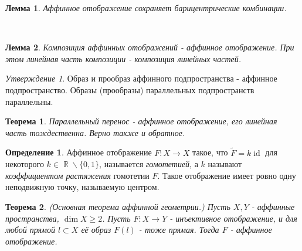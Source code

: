 \documentclass[a4paper,100pt]{article}
\theoremstyle{indented}
\newtheorem{theorem}{Теорема}
\newtheorem{lemma}{Лемма}
\theoremstyle{definition}
\newtheorem{defn}{Определение}
\theoremstyle{remark}
\newtheorem{stat}{Утверждение}
\DeclareMathOperator{\ra}{\rightarrow}
\DeclareMathOperator{\id}{id}
\DeclareMathOperator{\RR}{\mathbb{R}}
\begin{document}
\begin{lemma}
    Аффинное отображение сохраняет барицентрические комбинации.
\end{lemma} \ 

\begin{lemma}
    Композиция аффинных отображений - аффинное отображение. При этом линейная часть композиции - композиция линейных частей.
\end{lemma}

\begin{stat}
    Образ и прообраз аффинного подпространства - аффинное подпространство. Образы (прообразы) параллельных подпространств параллельны.
\end{stat}

\begin{theorem}
    Параллельный перенос - аффинное отображение, его линейная часть тождественна. Верно также и обратное.
\end{theorem}

\begin{defn}
    Аффинное отображение $F:X\ra X$ такое, что $\tilde{F}=k \id$ для некоторого $k \in \RR\backslash \{0, 1\}$, называется \textit{гомотетией}, а $k$ называют \textit{коэффициентом растяжения} гомотетии $F$. Такое отображение имеет ровно одну неподвижную точку, называемую центром.
\end{defn}

\begin{theorem}
    (\textit{Основная теорема аффинной геометрии.}) Пусть $X, Y$ - аффинные пространства, $\dim X \geq 2$. Пусть $F: X\ra Y$ - инъективное отображение, и для любой прямой $l\subset X$ её образ $F(l)$ - тоже прямая. Тогда $F$ - аффинное отображение.
\end{theorem}
\end{document}
